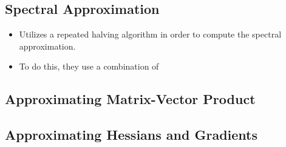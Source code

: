 \documentclass[10pt]{article}
\begin{document}
	\subsection{Spectral Approximation}
	\begin{itemize}
		\item Utilizes a repeated halving algorithm in order to compute the spectral approximation.   
		\item To do this, they use a combination of  
	\end{itemize}
	\subsection{Approximating Matrix-Vector Product} 
	\subsection{Approximating Hessians and Gradients}
\end{document}
